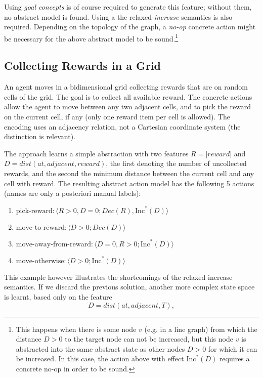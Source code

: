 \documentclass[12pt]{article}
\newcommand{\tuple}[1]{\ensuremath{\langle #1 \rangle}}
\newcommand{\abs}[1]{\ensuremath{\left\vert{#1}\right\vert}}
\newcommand{\Dec}{Dec}
\newcommand{\RInc}{\ensuremath{\text{Inc}^*}}  %
\begin{document}
Using \emph{goal concepts} is of course required to generate this feature; without them, no abstract model is found.
Using a the relaxed \emph{increase} semantics is also required.
Depending on the topology of the graph, a \emph{no-op} concrete action might be necessary for the above abstract model to be sound.\footnote{
This happens when there is some node $v$ (e.g. in a line graph) from which the distance $D>0$ to the target node can not be increased, but this
node $v$ is abstracted into the same abstract state as other nodes $D>0$ for which it can be increased. In this case, the action above with effect
$\RInc(D)$ requires a concrete no-op in order to be sound.
}

\subsection{Collecting Rewards in a Grid}

An agent moves in a bidimensional grid collecting rewards that are on random cells of the grid. The goal is to collect all available reward.
The concrete actions allow the agent to move between any two adjacent cells, and to pick the reward on the current cell, if any (only one reward item per cell is allowed).
The encoding uses an adjacency relation, not a Cartesian coordinate system (the distinction is relevant).

The approach learns a simple abstraction with two features $R = \abs{reward}$ and $D = dist(at, adjacent, reward)$, the first denoting the number of uncollected rewards,
and the second the minimum distance between the current cell and any cell with reward. The resulting abstract action model has the following 5 actions (names are only a posteriori manual labels):

\begin{enumerate}
 \item $\text{pick-reward}: \tuple{R>0, D=0; \Dec(R), \RInc(D)}$
 
 \item $\text{move-to-reward}: \tuple{D>0; \Dec(D)}$
 \item $\text{move-away-from-reward}: \tuple{D=0, R>0; \RInc(D)}$
 \item $\text{move-otherwise}: \tuple{D>0; \RInc(D)}$
\end{enumerate}



This example however illustrates the shortcomings of the relaxed increase semantics. 
If we discard the previous solution, another more complex state space is learnt, based only on the feature
\[D = dist(at, adjacent, T), \]
\end{document}
